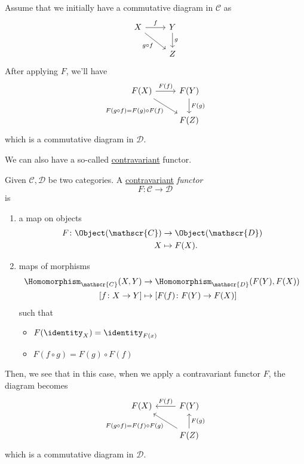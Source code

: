 \begin{prev}
	Assume that we initially have a commutative diagram in \(\mathscr{C} \) as
	\[
		\begin{tikzcd}
			X \ar[rd, "g\circ f"']\ar[r, "f"] & Y\ar[d, "g"]\\
			& Z
		\end{tikzcd}
	\]
	After applying \(F\), we'll have
	\[
		\begin{tikzcd}
			F(X) \ar[rd, "F(g\circ f)=F(g)\circ F(f)"']\ar[r, "F(f)"] & F(Y)\ar[d, "F(g)"]\\
			& F(Z)
		\end{tikzcd}
	\]
	which is a commutative diagram in \(\mathscr{D}\).
\end{prev}

We can also have a so-called \underline{contravariant} functor.
\begin{definition}
	Given \(\mathscr{C} , \mathscr{D} \) be two categories. A \underline{contravariant} \emph{functor}
	\[
		F\colon \mathscr{C} \to \mathscr{D}
	\]
	is
	\begin{enumerate}
		\item a map on objects
		      \[
			      \begin{split}
				      F\colon \Object(\mathscr{C} )&\to \Object(\mathscr{D} )\\
				      X&\mapsto F(X).
			      \end{split}
		      \]
		\item maps of morphisms
		      \[
			      \begin{split}
				      \Homomorphism_{\mathscr{C} }(X, Y)&\to \Homomorphism_{\mathscr{D} }(F(Y), F(X))\\
				      \left[f\colon X\to Y\right] &\mapsto \left[F(f)\colon F(Y)\to F(X)\right]
			      \end{split}
		      \]
		      such that
		      \begin{itemize}
			      \item \(F(\identity_{X} ) = \identity_{F(x)} \)
			      \item \(F(f\circ g) = F(g)\circ F(f)\)
		      \end{itemize}
	\end{enumerate}
\end{definition}

Then, we see that in this case, when we apply a contravariant functor \(F\), the diagram becomes
\[
	\begin{tikzcd}
		F(X)  & F(Y)\ar[l, "F(f)"']\\
		& F(Z)\ar[lu, "F(g\circ f)=F(f)\circ F(g)"]\ar[u, "F(g)"']
	\end{tikzcd}
\]
which is a commutative diagram in \(\mathscr{D}\).

